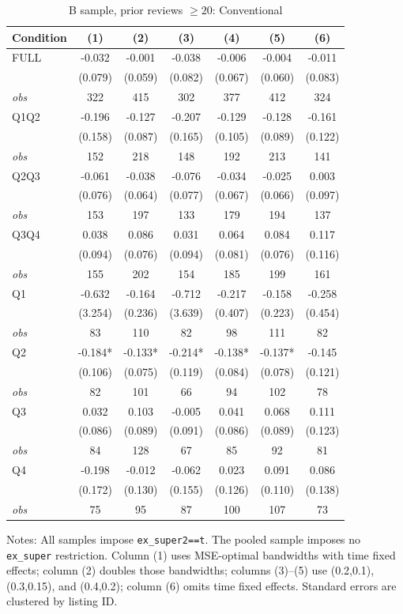\begin{table}[!htbp]
\centering
\caption{B sample, prior reviews $\geq20$: Conventional}
\begin{tabular}{lcccccc}
\toprule
Condition & (1) & (2) & (3) & (4) & (5) & (6) \\
\midrule
FULL & -0.032 & -0.001 & -0.038 & -0.006 & -0.004 & -0.011 \\
 & (0.079) & (0.059) & (0.082) & (0.067) & (0.060) & (0.083) \\
\textit{obs} & 322 & 415 & 302 & 377 & 412 & 324 \\
Q1Q2 & -0.196 & -0.127 & -0.207 & -0.129 & -0.128 & -0.161 \\
 & (0.158) & (0.087) & (0.165) & (0.105) & (0.089) & (0.122) \\
\textit{obs} & 152 & 218 & 148 & 192 & 213 & 141 \\
Q2Q3 & -0.061 & -0.038 & -0.076 & -0.034 & -0.025 & 0.003 \\
 & (0.076) & (0.064) & (0.077) & (0.067) & (0.066) & (0.097) \\
\textit{obs} & 153 & 197 & 133 & 179 & 194 & 137 \\
Q3Q4 & 0.038 & 0.086 & 0.031 & 0.064 & 0.084 & 0.117 \\
 & (0.094) & (0.076) & (0.094) & (0.081) & (0.076) & (0.116) \\
\textit{obs} & 155 & 202 & 154 & 185 & 199 & 161 \\
Q1 & -0.632 & -0.164 & -0.712 & -0.217 & -0.158 & -0.258 \\
 & (3.254) & (0.236) & (3.639) & (0.407) & (0.223) & (0.454) \\
\textit{obs} & 83 & 110 & 82 & 98 & 111 & 82 \\
Q2 & -0.184* & -0.133* & -0.214* & -0.138* & -0.137* & -0.145 \\
 & (0.106) & (0.075) & (0.119) & (0.084) & (0.078) & (0.121) \\
\textit{obs} & 82 & 101 & 66 & 94 & 102 & 78 \\
Q3 & 0.032 & 0.103 & -0.005 & 0.041 & 0.068 & 0.111 \\
 & (0.086) & (0.089) & (0.091) & (0.086) & (0.089) & (0.123) \\
\textit{obs} & 84 & 128 & 67 & 85 & 92 & 81 \\
Q4 & -0.198 & -0.012 & -0.062 & 0.023 & 0.091 & 0.086 \\
 & (0.172) & (0.130) & (0.155) & (0.126) & (0.110) & (0.138) \\
\textit{obs} & 75 & 95 & 87 & 100 & 107 & 73 \\
\bottomrule
\end{tabular}
\begin{minipage}{0.98\textwidth}\footnotesize
Notes: All samples impose \texttt{ex\_super2==t}. The pooled sample imposes no \texttt{ex\_super} restriction. Column (1) uses MSE-optimal bandwidths with time fixed effects; column (2) doubles those bandwidths; columns (3)--(5) use (0.2,0.1), (0.3,0.15), and (0.4,0.2); column (6) omits time fixed effects. Standard errors are clustered by listing ID.
\end{minipage}
\end{table}

